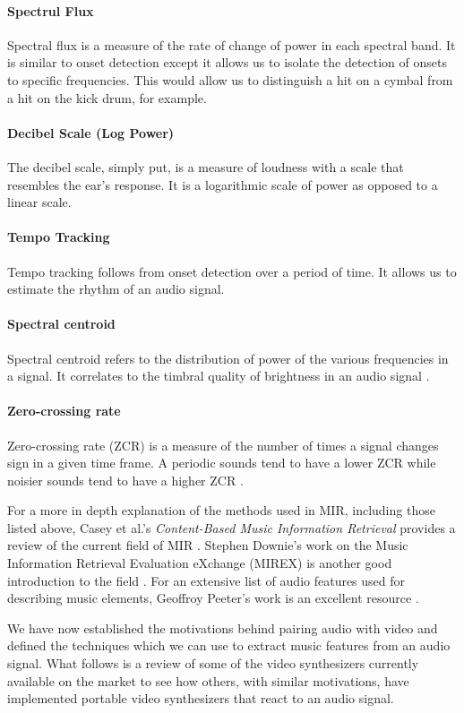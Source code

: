 \documentclass[../initial_thesis.tex]{subfiles}
\begin{document}
\paragraph{Spectrul Flux}
Spectral flux is a measure of the rate of change of power in each spectral band. It is similar to onset detection except it allows us to isolate the detection of onsets to specific frequencies. This would allow us to distinguish a hit on a cymbal from a hit on the kick drum, for example.

\paragraph{Decibel Scale (Log Power)}
The decibel scale, simply put, is a measure of loudness with a scale that resembles the ear's response. It is a logarithmic scale of power as opposed to a linear scale.

\paragraph{Tempo Tracking}
Tempo tracking follows from onset detection over a period of time. It allows us to estimate the rhythm of an audio signal.

\paragraph{Spectral centroid}
Spectral centroid refers to the distribution of power of the various frequencies in a signal. It correlates to the timbral quality of brightness in an audio signal \cite{Schubert}.

\paragraph{Zero-crossing rate}
Zero-crossing rate (ZCR) is a measure of the number of times a signal changes sign in a given time frame. A periodic sounds tend to have a lower ZCR while noisier sounds tend to have a higher ZCR \cite{Peeters2004}.

\vspace{\baselineskip}

For a more in depth explanation of the methods used in MIR, including those listed above, Casey et al.'s \textit{Content-Based Music Information Retrieval} provides a review of the current field of MIR \cite{Casey2008}. Stephen Downie's work on the Music Information Retrieval Evaluation eXchange (MIREX) is another good introduction to the field \cite{Downie}. For an extensive list of audio features used for describing music elements, Geoffroy Peeter's work is an excellent resource \cite{Peeters2004}.
\par

We have now established the motivations behind pairing audio with video and defined the techniques which we can use to extract music features from an audio signal. What follows is a review of some of the video synthesizers currently available on the market to see how others, with similar motivations, have implemented portable video synthesizers that react to an audio signal.

\end{document}
